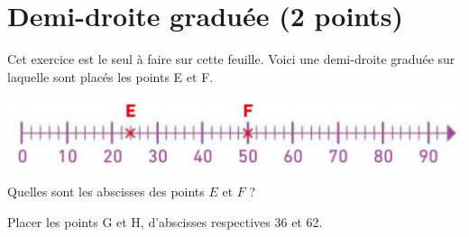 \section{Demi-droite graduée (2 points)}

{\LARGE Cet exercice est le seul à faire sur cette feuille.}
Voici une demi-droite graduée sur laquelle sont placés les points E et F.

\begin{center}
	\includegraphics[scale=0.55]{img/droites2}
\end{center}

\begin{questions}
	\question[1] Quelles sont les abscisses des points $E$ et $F$ ?
	
	\question[1] Placer les points G et H, d'abscisses respectives 36 et 62.
\end{questions}